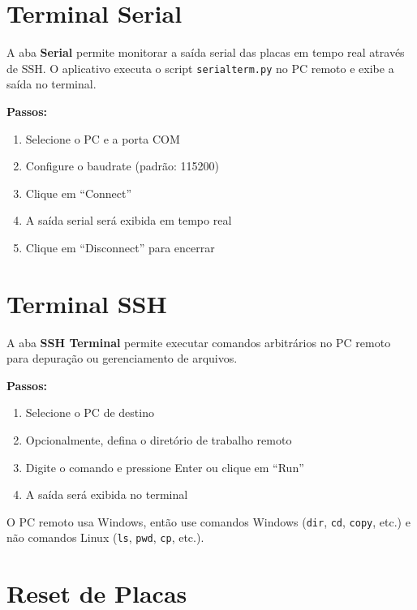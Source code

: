 \documentclass[12pt,a4paper]{article}
\begin{document}
\section{Terminal Serial}

A aba \textbf{Serial} permite monitorar a saída serial das placas em tempo real através de SSH. O aplicativo executa o script \texttt{serialterm.py} no PC remoto e exibe a saída no terminal.

\textbf{Passos:}
\begin{enumerate}[nosep]
  \item Selecione o PC e a porta COM
  \item Configure o baudrate (padrão: 115200)
  \item Clique em ``Connect''
  \item A saída serial será exibida em tempo real
  \item Clique em ``Disconnect'' para encerrar
\end{enumerate}

\section{Terminal SSH}

A aba \textbf{SSH Terminal} permite executar comandos arbitrários no PC remoto para depuração ou gerenciamento de arquivos.

\textbf{Passos:}
\begin{enumerate}[nosep]
  \item Selecione o PC de destino
  \item Opcionalmente, defina o diretório de trabalho remoto
  \item Digite o comando e pressione Enter ou clique em ``Run''
  \item A saída será exibida no terminal
\end{enumerate}

\begin{notabox}
O PC remoto usa Windows, então use comandos Windows (\texttt{dir}, \texttt{cd}, \texttt{copy}, etc.) e não comandos Linux (\texttt{ls}, \texttt{pwd}, \texttt{cp}, etc.).
\end{notabox}

\section{Reset de Placas}
\end{document}
